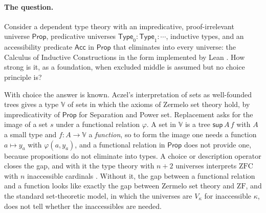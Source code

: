 \documentclass[10pt]{article}
\theoremstyle{definition}
\theoremstyle{remark}
\newcommand{\Prop}{\mathsf{Prop}}
\newcommand{\Type}{\mathsf{Type}}
\newcommand{\ZF}{\mathrm{ZF}}
\newcommand{\ZFC}{\mathrm{ZFC}}
\newcommand{\Acc}{\mathsf{Acc}}
\newcommand{\V}{\mathbb{V}}
\begin{document}
\paragraph{The question.}
Consider a dependent type theory with an impredicative, proof-irrelevant
universe $\Prop$, predicative universes $\Type_0:\Type_1:\cdots$,
inductive types, and an accessibility predicate $\Acc$ in $\Prop$ that
eliminates into every universe: the Calculus of Inductive Constructions
in the form implemented by Lean \cite{lean4,carneiro19}. How strong is
it, as a foundation, when excluded middle is assumed but no choice
principle is?

With choice the answer is known. Aczel's interpretation of sets as
well-founded trees \cite{aczel78} gives a type $\V$ of sets in which
the axioms of Zermelo set theory hold, by impredicativity of $\Prop$ for
Separation and Power set. Replacement asks for the image of a set $s$
under a functional relation $\varphi$. A set in $\V$ is a tree
$\mathsf{sup}\,A\,f$ with $A$ a small type and $f:A\to\V$ a
\emph{function}, so to form the image one needs a function $a\mapsto y_a$
with $\varphi(a,y_a)$, and a functional relation in $\Prop$ does not
provide one, because propositions do not eliminate into types. A choice
or description operator closes the gap, and with it the type theory
with $n+2$ universes interprets $\ZFC$ with $n$ inaccessible cardinals
\cite{werner97,barras10,carneiro19,kirstsmolka18,kirstsmolka19}. Without it, the gap between a
functional relation and a function looks like exactly the gap between
Zermelo set theory and $\ZF$, and the standard set-theoretic model, in
which the universes are $V_\kappa$ for inaccessible $\kappa$, does not tell
whether the inaccessibles are needed.
\end{document}
